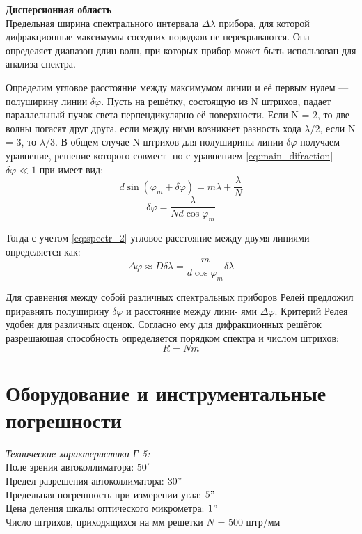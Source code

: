 \textbf{Дисперсионная область}\\
\indent Предельная ширина спектрального интервала $\Delta \lambda$ прибора, для которой дифракционные максимумы соседних порядков не перекрываются. Она определяет диапазон длин волн, при которых прибор может быть использован для
анализа спектра.

\indent Определим угловое расстояние между максимумом линии и её первым нулем — полуширину линии $\delta \varphi$. Пусть на решётку, состоящую из N штрихов, падает параллельный пучок света перпендикулярно её поверхности. Если
N = 2, то две волны погасят друг друга, если между ними возникнет
разность хода $\lambda/2$, если N = 3, то $\lambda/3$. В общем случае N штрихов для полуширины линии $\delta \varphi$ получаем уравнение, решение которого совмест-
но с уравнением \ref{eq:main_difraction} $\delta \varphi \ll 1$ при имеет вид:
\begin{equation}
    d\sin(\varphi_m + \delta \varphi) = m\lambda + \frac{\lambda}{N}
\end{equation}
\begin{equation}
    \delta \varphi = \frac{\lambda}{Nd\cos\varphi_m}
\end{equation}

\indent Тогда с учетом \ref{eq:spectr_2} угловое расстояние между двумя линиями определяется как:
\begin{equation}
    \Delta \varphi \approx D\delta \lambda = \frac{m}{d\cos\varphi_m}\delta \lambda
\end{equation}

\indent Для сравнения между собой различных спектральных приборов Релей предложил приравнять полуширину $\delta \varphi$ и расстояние между лини-
ями $\Delta \varphi$. Критерий Релея удобен для различных оценок. Согласно ему для дифракционных решёток разрешающая способность определяется порядком спектра и числом штрихов:
\begin{equation}
    R = N m
    \label{eq:Reley}
\end{equation}

\section*{Оборудование и инструментальные погрешности}
\noindent\textit{Технические характеристики Г-5:}\\
Поле зрения автоколлиматора: $50'$\\
Предел разрешения автоколлиматора: $30"$\\
Предельная погрешность при измерении угла: $5"$\\
Цена деления шкалы оптического микрометра: $1"$\\
Число штрихов, приходящихся на мм решетки $N$ = 500 штр/мм
